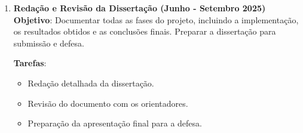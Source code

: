 \begin{enumerate}
    \item \textbf{Redação e Revisão da Dissertação (Junho - Setembro 2025)} \\
    \textbf{Objetivo}: Documentar todas as fases do projeto, incluindo a implementação, os resultados obtidos e as conclusões finais. Preparar a dissertação para submissão e defesa.
    
    \textbf{Tarefas}:
    \begin{itemize}
        \item Redação detalhada da dissertação.
        \item Revisão do documento com os orientadores.
        \item Preparação da apresentação final para a defesa.
    \end{itemize}
\end{enumerate}



